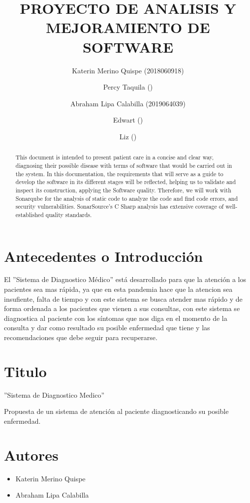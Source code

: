 \documentclass[preprint,12pt]{elsarticle}
\begin{document}
	
	\begin{frontmatter}

		\title{\huge  PROYECTO DE  ANALISIS Y  MEJORAMIENTO DE  SOFTWARE }
		\author{Katerin Merino Quispe              (2018060918)}
		\author{Percy Taquila                ()}
		\author{Abraham Lipa Calabilla (2019064039)}
		\author{Edwart                ()}
		\author{Liz                ()}
		\address{Tacna, Perú}
		


\begin{abstract}
This document is intended to present patient care in a concise and clear way, diagnosing their possible disease with terms of software that would be carried out in the system. In this documentation, the requirements that will serve as a guide to develop the software in its different stages will be reflected, helping us to validate and inspect its construction, applying the Software quality.
Therefore, we will work with Sonarqube for the analysis of static code to analyze the code and find code errors, and security vulnerabilities. SonarSource's C Sharp analysis has extensive coverage of well-established quality standards.  
\end{abstract}


\end{frontmatter}
\section{Antecedentes o Introducción}

El ''Sistema de Diagnostico Médico'' está desarrollado para que la atención a los pacientes sea mas rápida, ya que en esta pandemia hace que la atencion sea insufiente, falta de tiempo y con este sistema se busca atender mas rápido y de forma ordenada a los pacientes que vienen a sus consultas, con este sistema se diagnostica al paciente con los síntomas que nos diga en el momento de la consulta y dar como resultado su posible enfermedad que tiene y las recomendaciones que debe seguir para recuperarse.

\section{Titulo}
''Sistema de Diagnostico Medico''

Propuesta de un sistema de atención al paciente diagnosticando su posible enfermedad.
\section{Autores}
\begin{itemize}
    \item Katerin Merino Quispe
    \item Abraham Lipa Calabilla
    
\end{itemize}
\end{document}
